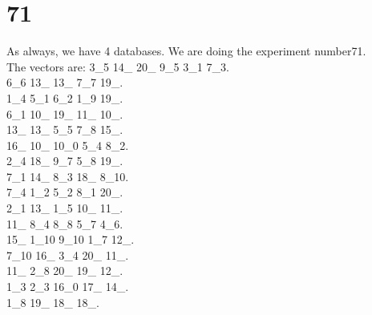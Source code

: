 \chapter{71}
\indent As always, we have 4 databases. We are doing the experiment number71.\\
The vectors are:
3\_5 14\_ 20\_ 9\_5 3\_1 7\_3.\\6\_6 13\_ 13\_ 7\_7 19\_.\\1\_4 5\_1 6\_2 1\_9 19\_.\\6\_1 10\_ 19\_ 11\_ 10\_.\\13\_ 13\_ 5\_5 7\_8 15\_.\\16\_ 10\_ 10\_0 5\_4 8\_2.\\2\_4 18\_ 9\_7 5\_8 19\_.\\7\_1 14\_ 8\_3 18\_ 8\_10.\\7\_4 1\_2 5\_2 8\_1 20\_.\\2\_1 13\_ 1\_5 10\_ 11\_.\\11\_ 8\_4 8\_8 5\_7 4\_6.\\15\_ 1\_10 9\_10 1\_7 12\_.\\7\_10 16\_ 3\_4 20\_ 11\_.\\11\_ 2\_8 20\_ 19\_ 12\_.\\1\_3 2\_3 16\_0 17\_ 14\_.\\1\_8 19\_ 18\_ 18\_.\\